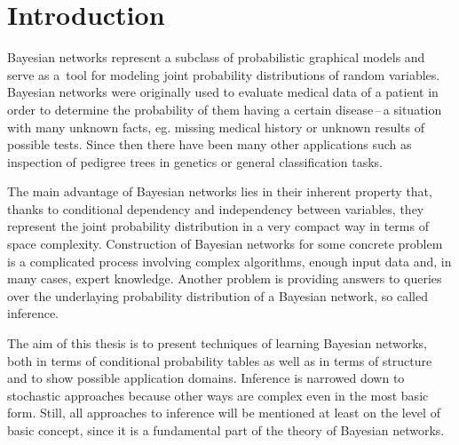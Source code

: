 \documentclass[english,cover]{fitthesis} %
\begin{document}
  \maketitle
  \tableofcontents
  


  









\chapter{Introduction}

Bayesian networks represent a subclass of probabilistic graphical models and serve as a~tool for modeling joint probability distributions of random variables. Bayesian networks were originally used to evaluate medical data of a patient in order to determine the probability of them having a certain disease\,--\,a situation with many unknown facts, eg. missing medical history or unknown results of possible tests. Since then there have been many other applications such as inspection of pedigree trees in genetics or general classification tasks.

The main advantage of Bayesian networks lies in their inherent property that, thanks to conditional dependency and independency between variables, they represent the joint probability distribution in a very compact way in terms of space complexity. Construction of Bayesian networks for some concrete problem is a complicated process involving complex algorithms, enough input data and, in many cases, expert knowledge. Another problem is providing answers to queries over the underlaying probability distribution of a Bayesian network, so called inference.

The aim of this thesis is to present techniques of learning Bayesian networks, both in terms of conditional probability tables as well as in terms of structure and to show possible application domains. Inference is narrowed down to stochastic approaches because other ways are complex even in the most basic form. Still, all approaches to inference will be mentioned at least on the level of basic concept, since it is a fundamental part of the theory of Bayesian networks.
\end{document}
